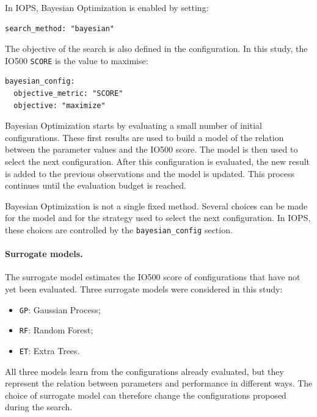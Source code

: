 In IOPS, Bayesian Optimization is enabled by setting:

\begin{verbatim}
search_method: "bayesian"
\end{verbatim}

The objective of the search is also defined in the configuration. In this
study, the IO500 \texttt{SCORE} is the value to maximise:

\begin{verbatim}
bayesian_config:
  objective_metric: "SCORE"
  objective: "maximize"
\end{verbatim}

Bayesian Optimization starts by evaluating a small number of initial
configurations. These first results are used to build a model of the
relation between the parameter values and the IO500 score. The model is
then used to select the next configuration. After this configuration is
evaluated, the new result is added to the previous observations and the
model is updated. This process continues until the evaluation budget is
reached.

Bayesian Optimization is not a single fixed method. Several choices can
be made for the model and for the strategy used to select the next
configuration. In IOPS, these choices are controlled by the
\texttt{bayesian\_config} section.

\paragraph{Surrogate models.}

The surrogate model estimates the IO500 score of configurations that have
not yet been evaluated. Three surrogate models were considered in this
study:

\begin{itemize}
    \item \texttt{GP}: Gaussian Process;
    \item \texttt{RF}: Random Forest;
    \item \texttt{ET}: Extra Trees.
\end{itemize}

All three models learn from the configurations already evaluated, but
they represent the relation between parameters and performance in
different ways. The choice of surrogate model can therefore change the
configurations proposed during the search.

